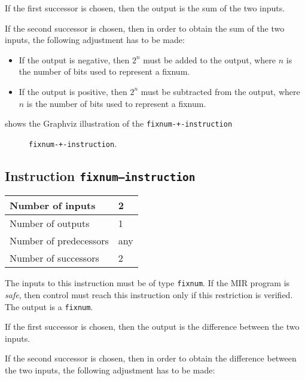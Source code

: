 If the first successor is chosen, then the output is
the sum of the two inputs.  

If the second successor is chosen, then in order to obtain the sum of the
two inputs, the following adjustment has to be made:

\begin{itemize}
\item If the output is negative, then $2^n$ must be added to the
  output, where $n$ is the number of bits used to represent a fixnum. 
\item If the output is positive, then $2^n$ must be subtracted from
  the output, where $n$ is the number of bits used to represent a
  fixnum.
\end{itemize}

 shows the Graphviz illustration of the
\texttt{fixnum-+-instruction}

\begin{figure}
\begin{center}
\end{center}
\caption{\label{fig-fixnum-+-instruction}
\texttt{fixnum-+-instruction}.}
\end{figure}

\subsection{Instruction \texttt{fixnum---instruction}}
\label{mir-instruction-fixnum--}

\begin{tabular}{|l|l|}
\hline
Number of inputs & 2\\
\hline
Number of outputs & 1\\
\hline
Number of predecessors & any\\
\hline
Number of successors & 2\\
\hline
\end{tabular}

The inputs to this instruction must be of type \texttt{fixnum}.  If the
MIR program is \emph{safe}, then control must reach this instruction
only if this restriction is verified.  The output is a
\texttt{fixnum}.  

If the first successor is chosen, then the output is
the difference between the two inputs.  

If the second successor is chosen, then in order to obtain the difference
between the two inputs, the following adjustment has to be made:

